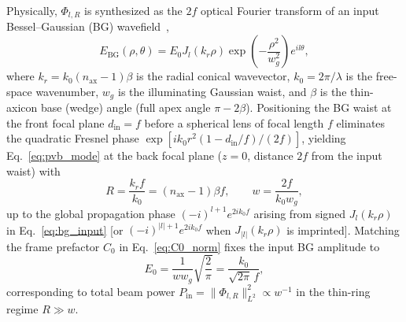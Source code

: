 \documentclass[aps,pra,onecolumn,notitlepage,11pt,tightenlines,nofootinbib,floatfix,longbibliography]{revtex4-2}
\theoremstyle{remark}
\newcommand{\norm}[1]{\lVert #1 \rVert}
\newcommand{\abs}[1]{\lvert #1 \rvert}
\begin{document}
Physically, $\Phi_{l,R}$ is synthesized as the $2f$ optical Fourier transform of an input Bessel--Gaussian (BG) wavefield~\cite{Vaity2015,Gori1987},
\begin{equation}
E_{\mathrm{BG}}(\rho,\theta) = E_0 J_l(k_r\rho)\exp\!\left(-\frac{\rho^2}{w_g^2}\right) e^{il\theta},
\label{eq:bg_input}
\end{equation}
where $k_r = k_0 (n_{\mathrm{ax}} - 1)\beta$ is the radial conical wavevector, $k_0 = 2\pi/\lambda$ is the free-space wavenumber, $w_g$ is the illuminating Gaussian waist, and $\beta$ is the thin-axicon base (wedge) angle (full apex angle $\pi - 2\beta$). Positioning the BG waist at the front focal plane $d_{\mathrm{in}} = f$ before a spherical lens of focal length $f$ eliminates the quadratic Fresnel phase $\exp[ik_0 r^2(1 - d_{\mathrm{in}}/f)/(2f)]$, yielding Eq.~\eqref{eq:pvb_mode} at the back focal plane ($z = 0$, distance $2f$ from the input waist) with~\cite{Vaity2015}
\begin{equation}
R = \frac{k_r f}{k_0} = (n_{\mathrm{ax}} - 1)\beta f, \qquad w = \frac{2f}{k_0 w_g},
\label{eq:R_w_2f}
\end{equation}
up to the global propagation phase $(-i)^{l+1} e^{2ik_0 f}$ arising from signed $J_l(k_r\rho)$ in Eq.~\eqref{eq:bg_input} [or $(-i)^{\abs{l}+1} e^{2ik_0 f}$ when $J_{\abs{l}}(k_r\rho)$ is imprinted]. Matching the frame prefactor $C_0$ in Eq.~\eqref{eq:C0_norm} fixes the input BG amplitude to
\begin{equation}
E_0 = \frac{1}{w w_g}\sqrt{\frac{2}{\pi}} = \frac{k_0}{\sqrt{2\pi}\,f},
\label{eq:E0_bridge}
\end{equation}
corresponding to total beam power $P_{\mathrm{in}} = \norm{\Phi_{l,R}}_{L^2}^2 \propto w^{-1}$ in the thin-ring regime $R \gg w$.
\end{document}
